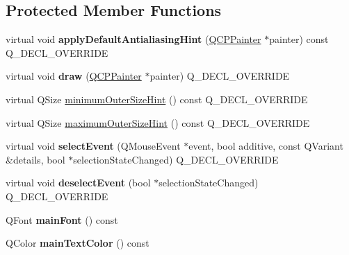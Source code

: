 \subsection*{Protected Member Functions}
\begin{DoxyCompactItemize}
\item 
virtual void {\bfseries apply\+Default\+Antialiasing\+Hint} (\hyperlink{classQCPPainter}{Q\+C\+P\+Painter} $\ast$painter) const Q\+\_\+\+D\+E\+C\+L\+\_\+\+O\+V\+E\+R\+R\+I\+DE\hypertarget{classQCPTextElement_a91f2e4b4a639d9079e89a0030c7ed352}{}\label{classQCPTextElement_a91f2e4b4a639d9079e89a0030c7ed352}

\item 
virtual void {\bfseries draw} (\hyperlink{classQCPPainter}{Q\+C\+P\+Painter} $\ast$painter) Q\+\_\+\+D\+E\+C\+L\+\_\+\+O\+V\+E\+R\+R\+I\+DE\hypertarget{classQCPTextElement_ad1dae61ea77ae74841f3c2fb765fc88e}{}\label{classQCPTextElement_ad1dae61ea77ae74841f3c2fb765fc88e}

\item 
virtual Q\+Size \hyperlink{classQCPTextElement_a47b8541f55ff520c557e0f27461f109e}{minimum\+Outer\+Size\+Hint} () const Q\+\_\+\+D\+E\+C\+L\+\_\+\+O\+V\+E\+R\+R\+I\+DE
\item 
virtual Q\+Size \hyperlink{classQCPTextElement_ae82475b50c10a5b3314d996d50ae536b}{maximum\+Outer\+Size\+Hint} () const Q\+\_\+\+D\+E\+C\+L\+\_\+\+O\+V\+E\+R\+R\+I\+DE
\item 
virtual void {\bfseries select\+Event} (Q\+Mouse\+Event $\ast$event, bool additive, const Q\+Variant \&details, bool $\ast$selection\+State\+Changed) Q\+\_\+\+D\+E\+C\+L\+\_\+\+O\+V\+E\+R\+R\+I\+DE\hypertarget{classQCPTextElement_a8d696ea82fa7bf743e01858039c03525}{}\label{classQCPTextElement_a8d696ea82fa7bf743e01858039c03525}

\item 
virtual void {\bfseries deselect\+Event} (bool $\ast$selection\+State\+Changed) Q\+\_\+\+D\+E\+C\+L\+\_\+\+O\+V\+E\+R\+R\+I\+DE\hypertarget{classQCPTextElement_a9a631a9deb9d82089a9d52de1744accf}{}\label{classQCPTextElement_a9a631a9deb9d82089a9d52de1744accf}

\item 
Q\+Font {\bfseries main\+Font} () const \hypertarget{classQCPTextElement_add703a8b26d42bfe2378c3f51dd5c9ce}{}\label{classQCPTextElement_add703a8b26d42bfe2378c3f51dd5c9ce}

\item 
Q\+Color {\bfseries main\+Text\+Color} () const \hypertarget{classQCPTextElement_aed22b0d84634c10d81da006956ef5abb}{}\label{classQCPTextElement_aed22b0d84634c10d81da006956ef5abb}

\end{DoxyCompactItemize}

